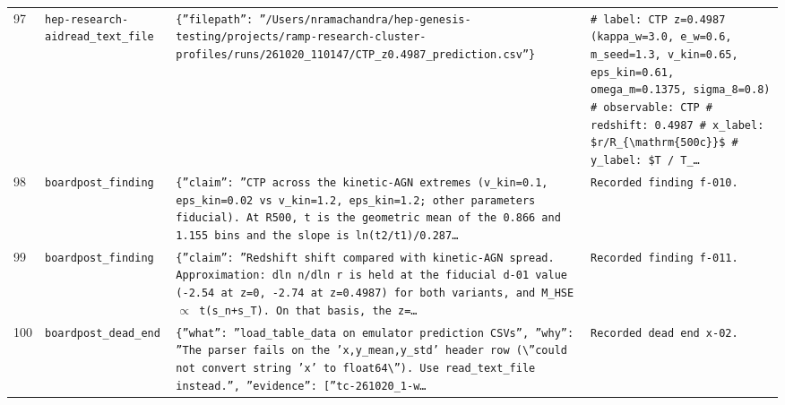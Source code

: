 \documentclass[11pt,a4paper]{article}
\begin{document}
\begin{longtable}{@{}p{}p{}p{}p{}@{}}
97 & \texttt{hep-research-aid}\newline\texttt{read\_\allowbreak{}text\_\allowbreak{}file} & \texttt{\{''filepath'':\allowbreak{} ''/\allowbreak{}Users/\allowbreak{}nramachandra/\allowbreak{}hep-genesis-testing/\allowbreak{}projects/\allowbreak{}ramp-research-cluster-profiles/\allowbreak{}runs/\allowbreak{}261020\_\allowbreak{}110147/\allowbreak{}CTP\_\allowbreak{}z0.4987\_\allowbreak{}prediction.csv''\}\allowbreak{}} & \texttt{\# label:\allowbreak{} CTP z=\allowbreak{}0.4987 (kappa\_\allowbreak{}w=\allowbreak{}3.0,\allowbreak{} e\_\allowbreak{}w=\allowbreak{}0.6,\allowbreak{} m\_\allowbreak{}seed=\allowbreak{}1.3,\allowbreak{} v\_\allowbreak{}kin=\allowbreak{}0.65,\allowbreak{} eps\_\allowbreak{}kin=\allowbreak{}0.61,\allowbreak{} omega\_\allowbreak{}m=\allowbreak{}0.1375,\allowbreak{} sigma\_\allowbreak{}8=\allowbreak{}0.8)\allowbreak{} \# observable:\allowbreak{} CTP \# redshift:\allowbreak{} 0.4987 \# x\_\allowbreak{}label:\allowbreak{} \$r/\allowbreak{}R\_\allowbreak{}\{\textbackslash{}\allowbreak{}mathrm\{500c\}\allowbreak{}\}\allowbreak{}\$ \# y\_\allowbreak{}label:\allowbreak{} \$T /\allowbreak{} T\_\allowbreak{}\ldots{}\allowbreak{}} \\
98 & \texttt{board}\newline\texttt{post\_\allowbreak{}finding} & \texttt{\{''claim'':\allowbreak{} ''CTP across the kinetic-AGN extremes (v\_\allowbreak{}kin=\allowbreak{}0.1,\allowbreak{} eps\_\allowbreak{}kin=\allowbreak{}0.02 vs v\_\allowbreak{}kin=\allowbreak{}1.2,\allowbreak{} eps\_\allowbreak{}kin=\allowbreak{}1.2;\allowbreak{} other parameters fiducial)\allowbreak{}. At R500,\allowbreak{} t is the geometric mean of the 0.866 and 1.155 bins and the slope is ln(t2/\allowbreak{}t1)\allowbreak{}/\allowbreak{}0.287\ldots{}\allowbreak{}} & \texttt{Recorded finding f-010.} \\
99 & \texttt{board}\newline\texttt{post\_\allowbreak{}finding} & \texttt{\{''claim'':\allowbreak{} ''Redshift shift compared with kinetic-AGN spread. Approximation:\allowbreak{} dln n/\allowbreak{}dln r is held at the fiducial d-01 value (-2.54 at z=\allowbreak{}0,\allowbreak{} -2.74 at z=\allowbreak{}0.4987)\allowbreak{} for both variants,\allowbreak{} and M\_\allowbreak{}HSE $\propto$ t(s\_\allowbreak{}n+s\_\allowbreak{}T)\allowbreak{}. On that basis,\allowbreak{} the z=\allowbreak{}\ldots{}\allowbreak{}} & \texttt{Recorded finding f-011.} \\
100 & \texttt{board}\newline\texttt{post\_\allowbreak{}dead\_\allowbreak{}end} & \texttt{\{''what'':\allowbreak{} ''load\_\allowbreak{}table\_\allowbreak{}data on emulator prediction CSVs'',\allowbreak{} ''why'':\allowbreak{} ''The parser fails on the 'x,\allowbreak{}y\_\allowbreak{}mean,\allowbreak{}y\_\allowbreak{}std' header row (\textbackslash{}\allowbreak{}''could not convert string 'x' to float64\textbackslash{}\allowbreak{}'')\allowbreak{}. Use read\_\allowbreak{}text\_\allowbreak{}file instead.'',\allowbreak{} ''evidence'':\allowbreak{} [''tc-261020\_\allowbreak{}1-w\ldots{}\allowbreak{}} & \texttt{Recorded dead end x-02.} \\

\end{longtable}
\end{document}
